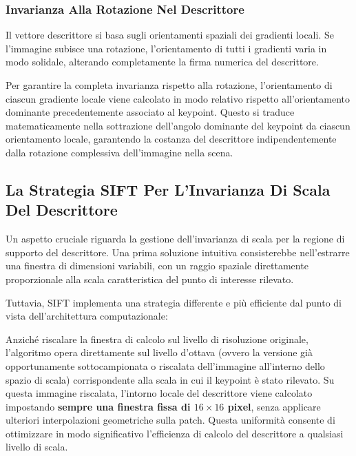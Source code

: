 ﻿\documentclass[11pt, a4paper]{article}
\begin{document}
\subsubsection{Invarianza Alla Rotazione Nel Descrittore}
Il vettore descrittore si basa sugli orientamenti spaziali dei gradienti locali. Se l'immagine subisce una rotazione, l'orientamento di tutti i gradienti varia in modo solidale, alterando completamente la firma numerica del descrittore.

Per garantire la completa invarianza rispetto alla rotazione, l'orientamento di ciascun gradiente locale viene calcolato in modo relativo rispetto all'orientamento dominante precedentemente associato al keypoint. Questo si traduce matematicamente nella sottrazione dell'angolo dominante del keypoint da ciascun orientamento locale, garantendo la costanza del descrittore indipendentemente dalla rotazione complessiva dell'immagine nella scena.


\subsection{La Strategia SIFT Per L'Invarianza Di Scala Del Descrittore}

Un aspetto cruciale riguarda la gestione dell'invarianza di scala per la regione di supporto del descrittore. Una prima soluzione intuitiva consisterebbe nell'estrarre una finestra di dimensioni variabili, con un raggio spaziale direttamente proporzionale alla scala caratteristica del punto di interesse rilevato.


Tuttavia, SIFT implementa una strategia differente e più efficiente dal punto di vista dell'architettura computazionale:


Anziché riscalare la finestra di calcolo sul livello di risoluzione originale, l'algoritmo opera direttamente sul livello d'ottava (ovvero la versione già opportunamente sottocampionata o riscalata dell'immagine all'interno dello spazio di scala) corrispondente alla scala in cui il keypoint è stato rilevato. Su questa immagine riscalata, l'intorno locale del descrittore viene calcolato impostando \textbf{sempre una finestra fissa di $16 \times 16$ pixel}, senza applicare ulteriori interpolazioni geometriche sulla patch. Questa uniformità consente di ottimizzare in modo significativo l'efficienza di calcolo del descrittore a qualsiasi livello di scala.
\end{document}
